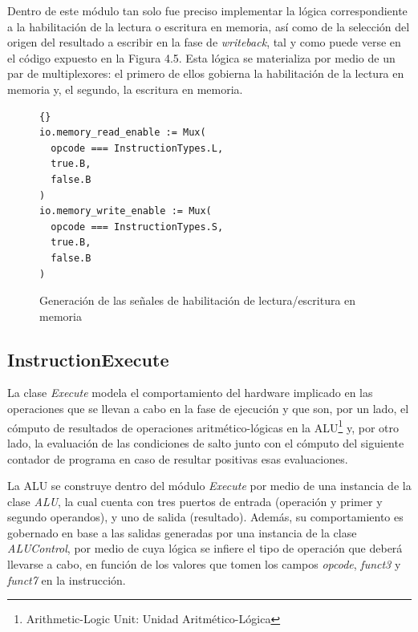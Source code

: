 Dentro de este módulo tan solo fue preciso implementar la lógica correspondiente a la habilitación de la lectura o escritura en memoria, así como de la selección del origen del resultado a escribir en la fase de \textit{writeback}, tal y como puede verse en el código expuesto en la Figura 4.5. Esta lógica se materializa por medio de un par de multiplexores: el primero de ellos gobierna la habilitación de la lectura en memoria y, el segundo, la escritura en memoria.

\vspace{+0.4cm}
\begin{figure}[h]
\begin{lstlisting}[style=scalaStyle]{}
io.memory_read_enable := Mux(
  opcode === InstructionTypes.L,
  true.B,
  false.B
)
io.memory_write_enable := Mux(
  opcode === InstructionTypes.S,
  true.B,
  false.B
)
\end{lstlisting}
\vspace{-0.2cm}
\caption{Generación de las señales de habilitación de lectura/escritura en memoria}
\end{figure}
\vspace{-0.2cm}

\subsection{InstructionExecute}

La clase \textit{Execute} modela el comportamiento del hardware implicado en las operaciones que se llevan a cabo en la fase de ejecución y que son, por un lado, el cómputo de resultados de operaciones aritmético-lógicas en la ALU\footnote{Arithmetic-Logic Unit: Unidad Aritmético-Lógica} y, por otro lado, la evaluación de las condiciones de salto junto con el cómputo del siguiente contador de programa en caso de resultar positivas esas evaluaciones.

La ALU se construye dentro del módulo \textit{Execute} por medio de una instancia de la clase \textit{ALU}, la cual cuenta con tres puertos de entrada (operación y primer y segundo operandos), y uno de salida (resultado). Además, su comportamiento es gobernado en base a las salidas generadas por una instancia de la clase \textit{ALUControl}, por medio de cuya lógica se infiere el tipo de operación que deberá llevarse a cabo, en función de los valores que tomen los campos \textit{opcode}, \textit{funct3} y \textit{funct7} en la instrucción.

